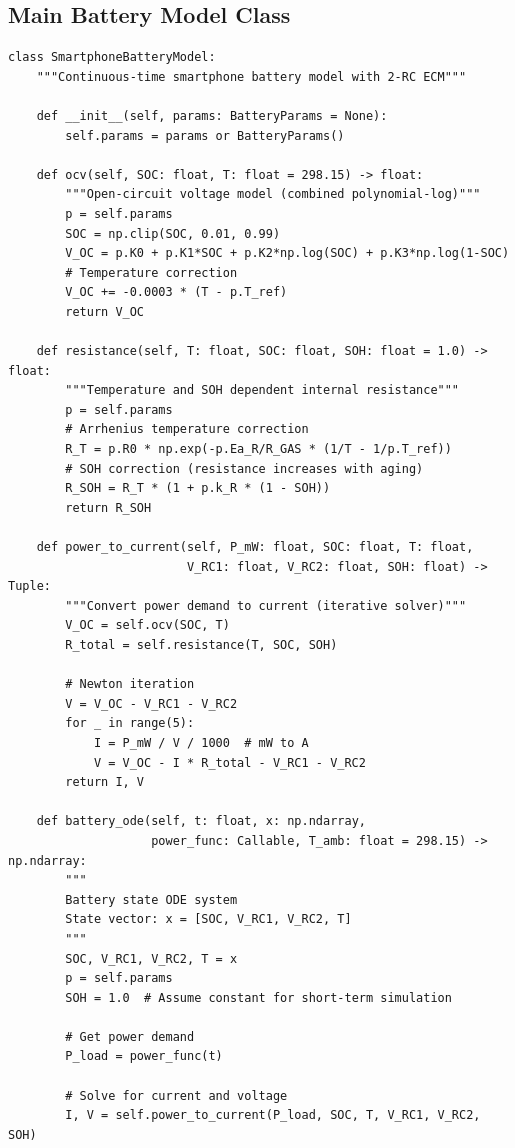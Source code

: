 \subsection{Main Battery Model Class}

\begin{lstlisting}[caption={Smartphone Battery Model Implementation}, label={lst:model}]
class SmartphoneBatteryModel:
    """Continuous-time smartphone battery model with 2-RC ECM"""
    
    def __init__(self, params: BatteryParams = None):
        self.params = params or BatteryParams()
    
    def ocv(self, SOC: float, T: float = 298.15) -> float:
        """Open-circuit voltage model (combined polynomial-log)"""
        p = self.params
        SOC = np.clip(SOC, 0.01, 0.99)
        V_OC = p.K0 + p.K1*SOC + p.K2*np.log(SOC) + p.K3*np.log(1-SOC)
        # Temperature correction
        V_OC += -0.0003 * (T - p.T_ref)
        return V_OC
    
    def resistance(self, T: float, SOC: float, SOH: float = 1.0) -> float:
        """Temperature and SOH dependent internal resistance"""
        p = self.params
        # Arrhenius temperature correction
        R_T = p.R0 * np.exp(-p.Ea_R/R_GAS * (1/T - 1/p.T_ref))
        # SOH correction (resistance increases with aging)
        R_SOH = R_T * (1 + p.k_R * (1 - SOH))
        return R_SOH
    
    def power_to_current(self, P_mW: float, SOC: float, T: float,
                         V_RC1: float, V_RC2: float, SOH: float) -> Tuple:
        """Convert power demand to current (iterative solver)"""
        V_OC = self.ocv(SOC, T)
        R_total = self.resistance(T, SOC, SOH)
        
        # Newton iteration
        V = V_OC - V_RC1 - V_RC2
        for _ in range(5):
            I = P_mW / V / 1000  # mW to A
            V = V_OC - I * R_total - V_RC1 - V_RC2
        return I, V
    
    def battery_ode(self, t: float, x: np.ndarray,
                    power_func: Callable, T_amb: float = 298.15) -> np.ndarray:
        """
        Battery state ODE system
        State vector: x = [SOC, V_RC1, V_RC2, T]
        """
        SOC, V_RC1, V_RC2, T = x
        p = self.params
        SOH = 1.0  # Assume constant for short-term simulation
        
        # Get power demand
        P_load = power_func(t)
        
        # Solve for current and voltage
        I, V = self.power_to_current(P_load, SOC, T, V_RC1, V_RC2, SOH)
        

\end{lstlisting}
